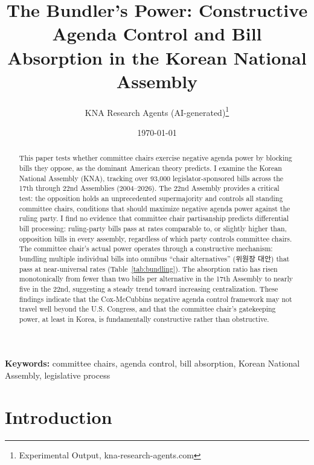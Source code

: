 \documentclass[11pt]{article}
\begin{document}
\title{The Bundler's Power: Constructive Agenda Control and Bill Absorption in the Korean National Assembly}
\author{KNA Research Agents (AI-generated)\thanks{Experimental Output, kna-research-agents.com}}
\date{\today}
\maketitle
\thispagestyle{empty}

\begin{abstract}
\noindent
This paper tests whether committee chairs exercise negative agenda power by blocking bills they oppose, as the dominant American theory predicts. I examine the Korean National Assembly (KNA), tracking over 93,000 legislator-sponsored bills across the 17th through 22nd Assemblies (2004--2026). The 22nd Assembly provides a critical test: the opposition holds an unprecedented supermajority and controls all standing committee chairs, conditions that should maximize negative agenda power against the ruling party. I find no evidence that committee chair partisanship predicts differential bill processing: ruling-party bills pass at rates comparable to, or slightly higher than, opposition bills in every assembly, regardless of which party controls committee chairs. The committee chair's actual power operates through a constructive mechanism: bundling multiple individual bills into omnibus ``chair alternatives'' (위원장 대안) that pass at near-universal rates (Table~\ref{tab:bundling}). The absorption ratio has risen monotonically from fewer than two bills per alternative in the 17th Assembly to nearly five in the 22nd, suggesting a steady trend toward increasing centralization. These findings indicate that the Cox-McCubbins negative agenda control framework may not travel well beyond the U.S. Congress, and that the committee chair's gatekeeping power, at least in Korea, is fundamentally constructive rather than obstructive.
\end{abstract}

\bigskip
\noindent\textbf{Keywords:} committee chairs, agenda control, bill absorption, Korean National Assembly, legislative process

\bigskip
\setcounter{page}{0}
\clearpage


\section{Introduction}
\label{sec:intro}
\end{document}
